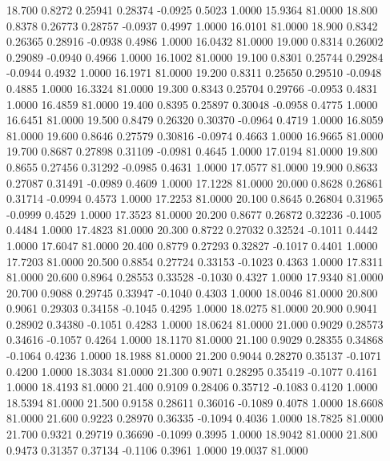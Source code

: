   18.700   0.8272   0.25941   0.28374  -0.0925   0.5023   1.0000  15.9364  81.0000
  18.800   0.8378   0.26773   0.28757  -0.0937   0.4997   1.0000  16.0101  81.0000
  18.900   0.8342   0.26365   0.28916  -0.0938   0.4986   1.0000  16.0432  81.0000
  19.000   0.8314   0.26002   0.29089  -0.0940   0.4966   1.0000  16.1002  81.0000
  19.100   0.8301   0.25744   0.29284  -0.0944   0.4932   1.0000  16.1971  81.0000
  19.200   0.8311   0.25650   0.29510  -0.0948   0.4885   1.0000  16.3324  81.0000
  19.300   0.8343   0.25704   0.29766  -0.0953   0.4831   1.0000  16.4859  81.0000
  19.400   0.8395   0.25897   0.30048  -0.0958   0.4775   1.0000  16.6451  81.0000
  19.500   0.8479   0.26320   0.30370  -0.0964   0.4719   1.0000  16.8059  81.0000
  19.600   0.8646   0.27579   0.30816  -0.0974   0.4663   1.0000  16.9665  81.0000
  19.700   0.8687   0.27898   0.31109  -0.0981   0.4645   1.0000  17.0194  81.0000
  19.800   0.8655   0.27456   0.31292  -0.0985   0.4631   1.0000  17.0577  81.0000
  19.900   0.8633   0.27087   0.31491  -0.0989   0.4609   1.0000  17.1228  81.0000
  20.000   0.8628   0.26861   0.31714  -0.0994   0.4573   1.0000  17.2253  81.0000
  20.100   0.8645   0.26804   0.31965  -0.0999   0.4529   1.0000  17.3523  81.0000
  20.200   0.8677   0.26872   0.32236  -0.1005   0.4484   1.0000  17.4823  81.0000
  20.300   0.8722   0.27032   0.32524  -0.1011   0.4442   1.0000  17.6047  81.0000
  20.400   0.8779   0.27293   0.32827  -0.1017   0.4401   1.0000  17.7203  81.0000
  20.500   0.8854   0.27724   0.33153  -0.1023   0.4363   1.0000  17.8311  81.0000
  20.600   0.8964   0.28553   0.33528  -0.1030   0.4327   1.0000  17.9340  81.0000
  20.700   0.9088   0.29745   0.33947  -0.1040   0.4303   1.0000  18.0046  81.0000
  20.800   0.9061   0.29303   0.34158  -0.1045   0.4295   1.0000  18.0275  81.0000
  20.900   0.9041   0.28902   0.34380  -0.1051   0.4283   1.0000  18.0624  81.0000
  21.000   0.9029   0.28573   0.34616  -0.1057   0.4264   1.0000  18.1170  81.0000
  21.100   0.9029   0.28355   0.34868  -0.1064   0.4236   1.0000  18.1988  81.0000
  21.200   0.9044   0.28270   0.35137  -0.1071   0.4200   1.0000  18.3034  81.0000
  21.300   0.9071   0.28295   0.35419  -0.1077   0.4161   1.0000  18.4193  81.0000
  21.400   0.9109   0.28406   0.35712  -0.1083   0.4120   1.0000  18.5394  81.0000
  21.500   0.9158   0.28611   0.36016  -0.1089   0.4078   1.0000  18.6608  81.0000
  21.600   0.9223   0.28970   0.36335  -0.1094   0.4036   1.0000  18.7825  81.0000
  21.700   0.9321   0.29719   0.36690  -0.1099   0.3995   1.0000  18.9042  81.0000
  21.800   0.9473   0.31357   0.37134  -0.1106   0.3961   1.0000  19.0037  81.0000
